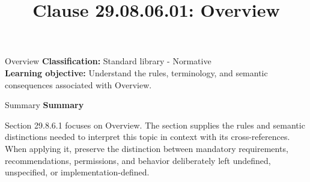 \documentclass[10pt,letterpaper]{article}
\title{Clause 29.08.06.01: Overview}
\author{}
\date{}
\begin{document}
\maketitle
\begin{CornellOverviewBox}{Overview}
\textbf{Classification:} Standard library - Normative\\[2pt]
\textbf{Learning objective:} Understand the rules, terminology, and semantic consequences associated with Overview.
\end{CornellOverviewBox}\begin{CornellSummaryBox}{Summary}
{\sffamily\bfseries\color{Accent} Summary}\par\vspace{3pt}Section 29.8.6.1 focuses on Overview. The section supplies the rules and semantic distinctions needed to interpret this topic in context with its cross-references. When applying it, preserve the distinction between mandatory requirements, recommendations, permissions, and behavior deliberately left undefined, unspecified, or implementation-defined.
\end{CornellSummaryBox}
\end{document}
